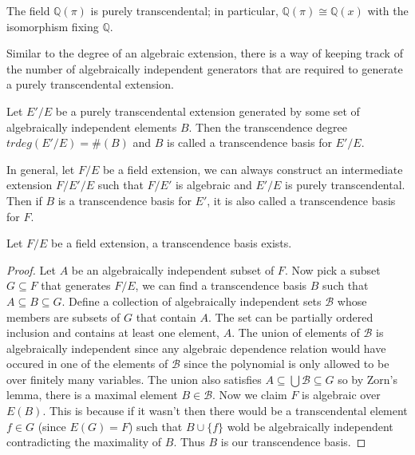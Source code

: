 \begin{example} The field $\mathbb{Q}(\pi)$ is purely transcendental; in
particular, $\mathbb{Q}(\pi)\cong\mathbb{Q}(x)$ with the isomorphism fixing
$\mathbb{Q}$. \end{example}
Similar to the degree of an algebraic extension, there is a way of keeping track
of the number of algebraically independent generators that are required to
generate a purely transcendental extension.
\begin{definition} Let $E'/E$ be a purely transcendental extension generated by
some set of algebraically independent elements $B$. Then the transcendence
degree $trdeg(E'/E)=\#(B)$ and $B$ is called a transcendence basis for $E'/E$.
\end{definition}
In general, let $F/E$ be a field extension, we can always construct an
intermediate extension $F/E'/E$ such that $F/E'$ is algebraic and $E'/E$ is
purely transcendental. Then if $B$ is a transcendence basis for $E'$, it is also
called a transcendence basis for $F$.
\begin{theorem} Let $F/E$ be a field extension, a transcendence basis exists.
\end{theorem}
\begin{proof} Let $A$ be an algebraically independent subset of $F$. Now pick a
subset $G\subseteq F$ that generates $F/E$, we can find a transcendence basis
$B$ such that $A\subseteq B\subseteq G$. Define a collection of algebraically
independent sets $\mathcal{B}$ whose members are subsets of $G$ that contain
$A$. The set can be partially ordered inclusion and contains at least one
element, $A$. The union of elements of $\mathcal{B}$ is algebraically
independent since any algebraic dependence relation would have occured in one of
the elements of $\mathcal{B}$ since the polynomial is only allowed to be over
finitely many variables. The union also satisfies $A\subseteq
\bigcup\mathcal{B}\subseteq G$ so by Zorn's lemma, there is a maximal element
$B\in\mathcal{B}$. Now we claim $F$ is algebraic over $E(B)$. This is because if
it wasn't then there would be a transcendental element $f\in G$ (since $E(G)=F$)
such that $B\cup\{f\}$ wold be algebraically independent contradicting the
maximality of $B$. Thus $B$ is our transcendence basis. \end{proof}


